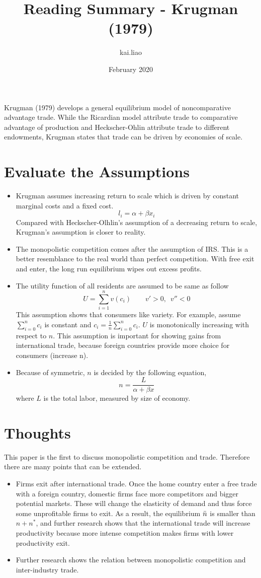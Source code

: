 \documentclass{article}
\title{Reading Summary - Krugman (1979)}
\author{kai.liao }
\date{February 2020}
\begin{document}
\maketitle

Krugman (1979) develops a general equilibrium model of noncomparative advantage trade. While the Ricardian model attribute trade to comparative advantage of production and Heckscher-Ohlin attribute trade to different endowments, Krugman states that trade can be driven by economies of scale. 
\section{Evaluate the Assumptions}
\begin{itemize}
  \item Krugman assumes increasing return to scale which is driven by constant marginal costs and a fixed cost. 
  $$l_i = \alpha + \beta x_i$$
  Compared with Heckscher-Olhlin's assumption of a decreasing return to scale, Krugman's assumption is closer to reality. 
  \item The monopolistic competition comes after the assumption of IRS. This is a better resemblance to the real world than perfect competition. With free exit and enter, the long run equilibrium wipes out excess profits. 
  \item The utility function of all residents are assumed to be same as follow
  $$U = \sum_{i = 1}^n v(c_i) \text{~~~~~~} v' > 0\text{,~~}v''<0$$
  This assumption shows that consumers like variety. For example, assume $\sum_{i = 0}^n c_i$ is constant and \newline $c_i = \frac{1}{n}\sum_{i = 0}^n c_i$. $U$ is monotonically increasing with respect to $n$. This assumption is important for showing gains from international trade, because foreign countries provide more choice for consumers (increase n). 
  
  \item Because of symmetric, $n$ is decided by the following equation,
  $$n = \frac{L}{\alpha + \beta x}$$
  where $L$ is the total labor, measured by size of economy.
  

\end{itemize}
\section{Thoughts}
This paper is the first to discuss monopolistic competition and trade. Therefore there are many points that can be extended.
\begin{itemize}
    \item Firms exit after international trade. Once  the  home  country  enter  a  free  trade  with  a  foreign  country,  domestic  firms  face  more  competitors  and bigger potential markets. These will change the elasticity of demand and thus force some unprofitable firms to exit. As a result, the equilibrium $\Bar{n}$ is smaller than $n+n^*$, and further research shows that the international trade will increase productivity because more intense competition makes firms with lower productivity exit.
    \item Further research shows the relation between monopolistic competition and inter-industry trade.
\end{itemize}
\end{document}
